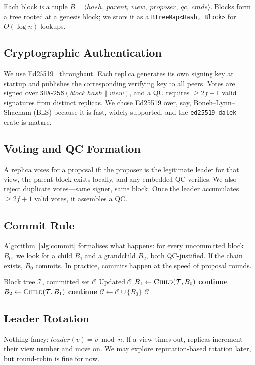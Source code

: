 Each block is a tuple
$B = \langle \mathit{hash},\ \mathit{parent},\ \mathit{view},\ \mathit{proposer},\
\mathit{qc},\ \mathit{cmds} \rangle$.
Blocks form a tree rooted at a genesis block; we store it as a
\texttt{BTreeMap<Hash, Block>} for $O(\log n)$ lookups.

\subsection{Cryptographic Authentication}

We use Ed25519~\cite{ed25519} throughout.  Each replica generates its own signing key at
startup and publishes the corresponding verifying key to all peers.  Votes are signed over
$\texttt{SHA-256}(\mathit{block\_hash} \| \mathit{view})$, and a QC requires $\ge 2f{+}1$
valid signatures from distinct replicas.  We chose Ed25519 over, say,
Boneh--Lynn--Shacham (BLS) because it is fast, widely supported, and the
\texttt{ed25519-dalek} crate is mature.

\subsection{Voting and QC Formation}

A replica votes for a proposal if: the proposer is the legitimate leader for that view, the
parent block exists locally, and any embedded QC verifies.  We also reject duplicate
votes---same signer, same block.  Once the leader accumulates $\ge 2f{+}1$ valid votes, it
assembles a QC.

\subsection{Commit Rule}

Algorithm~\ref{alg:commit} formalises what happens: for every uncommitted block $B_0$, we
look for a child $B_1$ and a grandchild $B_2$, both QC-justified.  If the chain exists,
$B_0$ commits.  In practice, commits happen at the speed of proposal rounds.

\begin{algorithm}[t]
\caption{3-chain commit detection}
\label{alg:commit}
\begin{algorithmic}[1]
\REQUIRE Block tree $\mathcal{T}$, committed set $\mathcal{C}$
\ENSURE Updated $\mathcal{C}$
    \STATE $B_1 \gets \textsc{Child}(\mathcal{T}, B_0)$
        \STATE \textbf{continue}
    \ENDIF
    \STATE $B_2 \gets \textsc{Child}(\mathcal{T}, B_1)$
        \STATE \textbf{continue}
    \ENDIF
    \STATE $\mathcal{C} \gets \mathcal{C} \cup \{B_0\}$
\ENDFOR
\RETURN $\mathcal{C}$
\end{algorithmic}
\end{algorithm}

\subsection{Leader Rotation}

Nothing fancy: $\textit{leader}(v) = v \bmod n$.  If a view times out, replicas increment
their view number and move on.  We may explore reputation-based rotation later, but
round-robin is fine for now.
